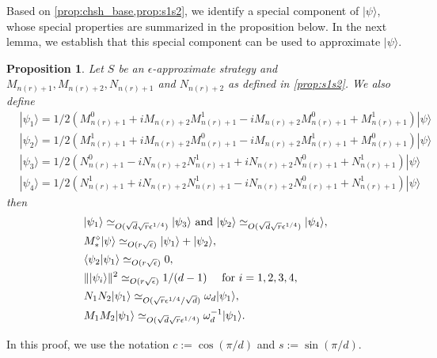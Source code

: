 \documentclass[11pt,letterpaper]{article}
\newcommand{\ket}[1]{|#1\rangle}
\newcommand{\braket}[2]{\langle#1|#2\rangle}
\DeclarePairedDelimiter{\norm}{\lVert}{\rVert}
\newcommand{\1}{\mathbb{1}}
\newcommand{\nr}{n(r)}
\newcommand{\ep}{\epsilon}
\newcommand{\se}{\sqrt{\epsilon}}
\newcommand{\qe}{\epsilon^{1/4}}
\newcommand{\sd}{\sqrt{d}}
\newcommand{\sr}{\sqrt{r}}
\newcommand{\appd}[1]{\simeq_{#1}}
\newtheorem{proposition}[theorem]{Proposition}
\theoremstyle{definition}
\begin{document}
Based on \cref{prop:chsh_base,prop:s1s2}, we identify a special component of $\ket{\psi}$, whose special properties are summarized
in the proposition below. In the next lemma, we establish that this special component can be used to approximate $\ket{\psi}$. 
\begin{proposition}
	Let $S$ be an $\ep$-approximate strategy and $M_{\nr+1}, M_{\nr+2},N_{\nr+1}$ and $N_{\nr+2}$ as defined in \cref{prop:s1s2}.
	We also define
	\begin{align}
		&\ket{\psi_1} =1/2(M_{\nr+1}^0 + iM_{\nr+2}M_{\nr+1}^1 - iM_{\nr+2}M_{\nr+1}^0 +M_{\nr+1}^1) \ket{\psi} \\
		&\ket{\psi_2} = 1/2(M_{\nr+1}^1 + iM_{\nr+2}M_{\nr+1}^0 -iM_{\nr+2}M_{\nr+1}^1 + M_{\nr+1}^0)  \ket{\psi} \\
		&\ket{\psi_3} =1/2 (N_{\nr+1}^0 - iN_{\nr+2}N_{\nr+1}^1+iN_{\nr+2}N_{\nr+1}^0 + N_{\nr+1}^1)\ket{\psi}\\
		&\ket{\psi_4} =1/2(N_{\nr+1}^1 + iN_{\nr+2}N_{\nr+1}^1 -iN_{\nr+2}N_{\nr+1}^0 + N_{\nr+1}^1)\ket{\psi}
	\end{align}
	then
	\begin{align}
	 \label{eq:psi1_eq} &\ket{\psi_1} \appd{O(\sd \sr\qe)} \ket{\psi_3} \text{ and } \ket{\psi_2} \appd{O(\sd \sr\qe)} \ket{\psi_4}, \\
	 \label{eq:psi1_sum} &M_\ast^\diamond \ket{\psi} \appd{O( r\se)} \ket{\psi_1}+\ket{\psi_2}, \\
	 \label{eq:psi1_orth} &\braket{\psi_2}{\psi_1} \appd{O( r\se)} 0,\\
	 \label{eq:psi1_norm} &\norm{\ket{\psi_i}}^2 \appd{O(r\se)} 1/(d-1) \quad \text{ for } i = 1, 2, 3, 4,\\
	 \label{eq:psi1_eig1} &N_1N_2 \ket{\psi_1} \appd{O(\sr \qe/\sd)} \omega_d\ket{\psi_1},\\
	 \label{eq:psi1_eig2} &M_1M_2 \ket{\psi_1} \appd{O(\sd\sr \qe)} \omega_d^{-1} \ket{\psi_1}.
	\end{align}
\end{proposition}
In this proof, we use the notation $c := \cos(\pi/d)$ and $s := \sin(\pi/d)$.
\end{document}
